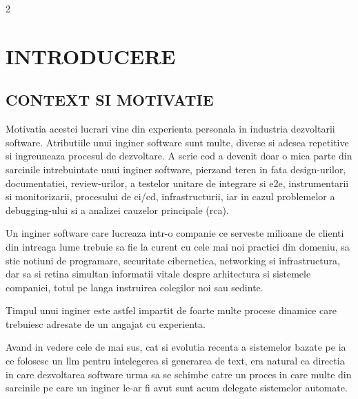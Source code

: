 \documentclass[12pt, a4paper, oneside, romanian, draft]{teza-upb}
\begin{document}

\beforepreface

\listoffigures
\listoftables

\begin{multicols}{2}
\printacronyms[heading=none]
\end{multicols}

\afterpreface


\newpage

\chapter*{INTRODUCERE}

\section*{CONTEXT SI MOTIVATIE}

  Motivatia acestei lucrari vine din experienta personala in industria dezvoltarii software. 
  Atributiile unui inginer software sunt multe, diverse si adesea repetitive si ingreuneaza procesul de dezvoltare. 
  A scrie cod a devenit doar o mica parte din sarcinile intrebuintate unui inginer software, pierzand teren in fata design-urilor, 
  documentatiei, review-urilor,
  a testelor unitare de integrare si \ac{e2e}, instrumentarii si monitorizarii, procesului de \ac{ci}/\ac{cd}, 
  infrastructurii, iar in cazul problemelor a debugging-ului si a analizei cauzelor principale (\ac{rca}).
  
  Un inginer software care lucreaza intr-o companie ce serveste milioane de clienti din intreaga lume trebuie sa fie la 
  curent cu cele mai noi practici
  din domeniu, sa stie notiuni de programare, securitate cibernetica, networking si infrastructura, 
  dar sa si retina simultan informatii vitale despre arhitectura si sistemele companiei, totul pe langa instruirea colegilor 
  noi sau sedinte.
  
  Timpul unui inginer este astfel impartit de foarte multe procese dinamice care trebuiesc adresate de un angajat 
  cu experienta.
  
  Avand in vedere cele de mai sus, cat si evolutia recenta a sistemelor bazate pe \ac{ia} ce folosesc un \ac{llm} pentru intelegerea
  si generarea de text, era natural ca directia in care dezvoltarea software urma sa se schimbe catre un proces in care
  multe din sarcinile pe care un inginer le-ar fi avut sunt acum delegate sistemelor automate.
  
\end{document}
